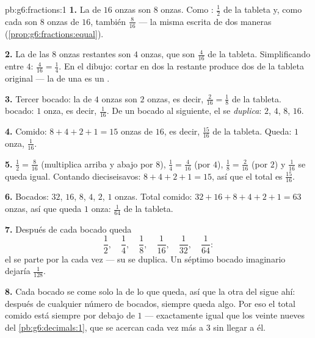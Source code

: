 \begin{solution}{pb:g6:fractions:1}
\textbf{1.} La  de $16$ onzas son $8$ onzas. Como :
$\frac12$ de la tableta y, como cada  son $8$ onzas de
$16$, también $\frac{8}{16}$ --- la misma  escrita de dos maneras
(\cref{prop:g6:fractions:equal}).

\textbf{2.} La  de las $8$ onzas restantes son $4$ onzas,
que son $\frac{4}{16}$ de la tableta. Simplificando entre $4$:
$\frac{4}{16} = \frac14$. En el dibujo: cortar en dos la 
restante produce dos  de la tableta original --- la  de
una  es un .

\textbf{3.} Tercer bocado: la  de $4$ onzas son $2$ onzas, es decir,
$\frac{2}{16} = \frac18$ de la tableta.  bocado: $1$ onza,
es decir, $\frac{1}{16}$. De un bocado al siguiente, el 
se \emph{duplica}: $2$, $4$, $8$, $16$.

\textbf{4.} Comido: $8 + 4 + 2 + 1 = 15$ onzas de $16$, es
decir, $\frac{15}{16}$ de la tableta. Queda: $1$ onza, $\frac{1}{16}$.

\textbf{5.} $\frac12 = \frac{8}{16}$ (multiplica arriba y abajo por
$8$), $\frac14 = \frac{4}{16}$ (por $4$), $\frac18 = \frac{2}{16}$
(por $2$) y $\frac{1}{16}$ se queda igual. Contando dieciseisavos:
$8 + 4 + 2 + 1 = 15$, así que el total es $\frac{15}{16}$.

\textbf{6.} Bocados: $32$, $16$, $8$, $4$, $2$, $1$ onzas. Total
comido: $32 + 16 + 8 + 4 + 2 + 1 = 63$ onzas, así que queda $1$ onza:
$\frac{1}{64}$ de la tableta.

\textbf{7.} Después de cada bocado queda
\[
\frac12,\quad \frac14,\quad \frac18,\quad \frac{1}{16},\quad
\frac{1}{32},\quad \frac{1}{64} :
\]
el  se parte por la  cada vez --- su  se duplica. Un
séptimo bocado imaginario dejaría $\frac{1}{128}$.

\textbf{8.} Cada bocado se come solo la \emph{} de lo que queda, así que
la otra  del  sigue ahí: después de cualquier número
de bocados, siempre queda algo. Por eso el total comido está
siempre por debajo de $1$ --- exactamente igual que los veinte nueves del
\cref{pb:g6:decimals:1}, que se acercan cada vez más a $3$ sin
llegar a él.


\end{solution}
